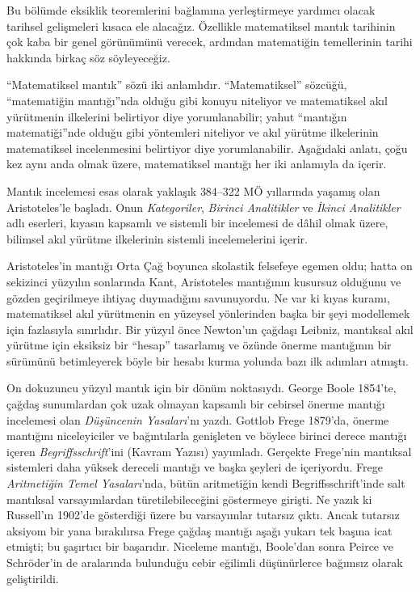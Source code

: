 



Bu bölümde eksiklik teoremlerini bağlamına yerleştirmeye yardımcı olacak
tarihsel gelişmeleri kısaca ele alacağız. Özellikle matematiksel mantık
tarihinin çok kaba bir genel görünümünü verecek, ardından matematiğin
temellerinin tarihi hakkında birkaç söz söyleyeceğiz.

\begin{digress}
  ``Matematiksel mantık'' sözü iki anlamlıdır. ``Matematiksel'' sözcüğü,
  ``matematiğin mantığı''nda olduğu gibi konuyu niteliyor ve matematiksel
  akıl yürütmenin ilkelerini belirtiyor diye yorumlanabilir; yahut
  ``mantığın matematiği''nde olduğu gibi yöntemleri niteliyor ve akıl
  yürütme ilkelerinin matematiksel incelenmesini belirtiyor diye
  yorumlanabilir. Aşağıdaki anlatı, çoğu kez aynı anda olmak üzere,
  matematiksel mantığı her iki anlamıyla da içerir.
\end{digress}

Mantık incelemesi esas olarak yaklaşık 384--322 \textsc{MÖ} yıllarında yaşamış olan
Aristoteles'le başladı. Onun \emph{Kategoriler}, \emph{Birinci Analitikler}
ve \emph{İkinci Analitikler} adlı eserleri, kıyasın kapsamlı ve sistemli bir
incelemesi de dâhil olmak üzere, bilimsel akıl yürütme ilkelerinin sistemli
incelemelerini içerir.

Aristoteles'in mantığı Orta Çağ boyunca skolastik felsefeye egemen oldu;
hatta on sekizinci yüzyılın sonlarında Kant, Aristoteles mantığının kusursuz
olduğunu ve gözden geçirilmeye ihtiyaç duymadığını savunuyordu. Ne var ki
kıyas kuramı, matematiksel akıl yürütmenin en yüzeysel yönlerinden başka bir
şeyi modellemek için fazlasıyla sınırlıdır. Bir yüzyıl önce Newton'un çağdaşı
Leibniz, mantıksal akıl yürütme için eksiksiz bir ``hesap'' tasarlamış ve
özünde önerme mantığının bir sürümünü betimleyerek böyle bir hesabı kurma
yolunda bazı ilk adımları atmıştı.

On dokuzuncu yüzyıl mantık için bir dönüm noktasıydı. George Boole 1854'te,
çağdaş sunumlardan çok uzak olmayan kapsamlı bir cebirsel önerme mantığı
incelemesi olan \emph{Düşüncenin Yasaları}'nı yazdı. Gottlob Frege 1879'da,
önerme mantığını niceleyiciler ve bağıntılarla genişleten ve böylece birinci
derece mantığı içeren \emph{Begriffsschrift}'ini (Kavram Yazısı) yayımladı.
Gerçekte Frege'nin mantıksal sistemleri daha yüksek dereceli mantığı ve
başka şeyleri de içeriyordu. Frege \emph{Aritmetiğin Temel Yasaları}'nda,
bütün aritmetiğin kendi Begriffsschrift'inde salt mantıksal varsayımlardan
türetilebileceğini göstermeye girişti. Ne yazık ki Russell'ın 1902'de
gösterdiği üzere bu varsayımlar tutarsız çıktı. Ancak tutarsız aksiyom bir
yana bırakılırsa Frege çağdaş mantığı aşağı yukarı tek başına icat etmişti;
bu şaşırtıcı bir başarıdır. Niceleme mantığı, Boole'dan sonra Peirce ve
Schr\"oder'in de aralarında bulunduğu cebir eğilimli düşünürlerce bağımsız
olarak geliştirildi.

